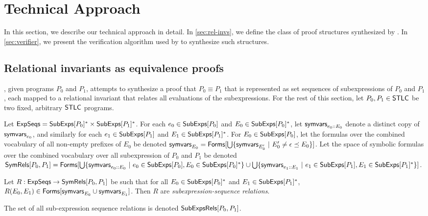 \section{Technical Approach}
%
In this section, we describe our technical approach in detail.
%
In \autoref{sec:rel-invs}, we define the class of proof
structures synthesized by \sys.
%
In \autoref{sec:verifier}, we present the verification algorithm used
by \sys to synthesize such structures.

\subsection{Relational invariants as equivalence proofs}
\label{sec:rel-invs}
%
\sys, given programs $P_0$ and $P_1$, attempts to synthesize a proof
that $P_0 \equiv P_1$ that is represented as set sequences of
subexpressions of $P_0$ and $P_1$, each mapped to a relational
invariant that relates all evaluations of the subexpressions.
%
For the rest of this section, let $P_0, P_1 \in \mathsf{STLC}$ be two fixed,
arbitrary $\mathsf{STLC}$ programs.

Let $\mathsf{ExpSeqs} = \mathsf{SubExps}[ P_0 ]^{*} \times \mathsf{SubExps}[ P_1 ]^{*}$.
%
For each $e_0 \in \mathsf{SubExps}[ P_0 ]$ and $E_0 \in \mathsf{SubExps}[ P_0 ]^{*}$, let
$\mathsf{symvars}_{e_0 \mathbin{::} E_0}$ denote a distinct copy of $\mathsf{symvars}_{e_0}$,
and similarly for each $e_1 \in \mathsf{SubExps}[ P_1 ]$ and $E_1 \in
\mathsf{SubExps}[ P_1 ]^{*}$.
%
For $E_0 \in \mathsf{SubExps}[  P_0  ]$, let the formulas over the combined
vocabulary of all non-empty prefixes of $E_0$ be denoted
$\symvars{E_0} = \formulas{ %
  \bigunion \setformer{ \symvars{E_0'} }{ E_0' \not= \epsilon \preceq
    E_0 } }$.
%
Let the space of symbolic formulas over the combined vocabulary over
all subexpression of $P_0$ and $P_1$ be denoted $\symrels{P_0}{P_1} =
\formulas{ %
  \bigunion \setformer{ \symvars{ e_0 \cons E_0 } }{ %
    e_0 \in \subexps{P_0}, E_0 \in \subexps{P_0}^{*} } \union %
  \bigunion \setformer{ \symvars{e_1 \cons E_1 } }{ %
    e_1 \in \subexps{P_1}, E_1 \in \subexps{P_1}^{*} } }$.
%
\begin{defn}
  \label{defn:sym-rels}
  Let $R: \mathsf{ExpSeqs} \to \mathsf{SymRels}[  P_0 ,  P_1  ]$ be such that %
  for all $E_0 \in \mathsf{SubExps}[ P_0 ]^{*}$ and $E_1 \in \mathsf{SubExps}[ P_1 ]^{*}$,
  $R(E_0, E_1) \in \mathsf{Forms}[  \mathsf{symvars}_{E_0} \cup \mathsf{symvars}_{ E_1 }
   ]$.
  Then $R$ are \emph{subexpression-sequence relations}.
\end{defn}
%
The set of all sub-expression sequence relations is denoted
$\mathsf{SubExpsRels}[ P_0, P_1 ]$.

